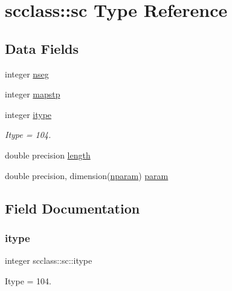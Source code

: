 \hypertarget{structscclass_1_1sc}{}\section{scclass\+::sc Type Reference}
\label{structscclass_1_1sc}
\subsection*{Data Fields}
\begin{DoxyCompactItemize}
\item 
integer \mbox{\hyperlink{structscclass_1_1sc_a32cf6178c767aecb2b10b7baa0221c78}{nseg}}
\item 
integer \mbox{\hyperlink{structscclass_1_1sc_ac919c69cd2bb089386f56a5ac75728f0}{mapstp}}
\item 
integer \mbox{\hyperlink{structscclass_1_1sc_a4ddd6baf3b915cf7ff25830e84ce6e75}{itype}}
\begin{DoxyCompactList}\small\item\em Itype = 104. \end{DoxyCompactList}\item 
double precision \mbox{\hyperlink{structscclass_1_1sc_ae9c1bce2c31838e6ec98bdbfe04cb6d7}{length}}
\item 
double precision, dimension(\mbox{\hyperlink{namespacescclass_a78eec9a89964d83818db291873df4436}{nparam}}) \mbox{\hyperlink{structscclass_1_1sc_a21e20d06bda8473fab959e3ee29e5183}{param}}
\end{DoxyCompactItemize}


\subsection{Field Documentation}
\mbox{\label{structscclass_1_1sc_a4ddd6baf3b915cf7ff25830e84ce6e75}} 
\subsubsection{\texorpdfstring{itype}{itype}}
{\footnotesize\ttfamily integer scclass\+::sc\+::itype}



Itype = 104. 

\mbox{\label{structscclass_1_1sc_ae9c1bce2c31838e6ec98bdbfe04cb6d7}} 
